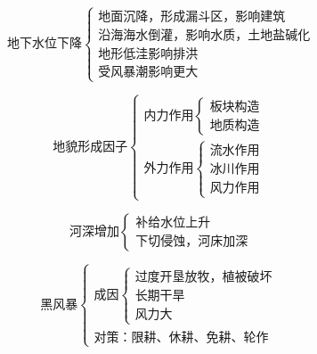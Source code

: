 \documentclass[UTF8]{ctexart}
\begin{document}
\begin{multicols}{2}
    
    \[
        \textbf{地下水位下降}
        \begin{cases}
            \text{地面沉降，形成漏斗区，影响建筑}\\
            \text{沿海海水倒灌，影响水质，土地盐碱化}\\
            \text{地形低洼影响排洪}\\
            \text{受风暴潮影响更大}
        \end{cases}
    \]

    \[
        \textbf{地貌形成因子}
        \begin{cases}
            \text{内力作用}
            \begin{cases}
                \text{板块构造}\\
                \text{地质构造}
            \end{cases}\\
            \text{外力作用}
            \begin{cases}
                \text{流水作用}\\
                \text{冰川作用}\\
                \text{风力作用}
            \end{cases}
        \end{cases}
    \]

\end{multicols}

\par

\begin{multicols}{2}

    \[
        \textbf{河深增加}
        \begin{cases}
            \text{补给水位上升}\\
            \text{下切侵蚀，河床加深}
        \end{cases}
    \]

    \[
        \textbf{黑风暴}
        \begin{cases}
            \text{成因}
            \begin{cases}
                \text{过度开垦放牧，植被破坏}\\
                \text{长期干旱}\\
                \text{风力大}
            \end{cases}\\
            \text{对策：限耕、休耕、免耕、轮作}
        \end{cases}
    \]

\end{multicols}
\end{document}
